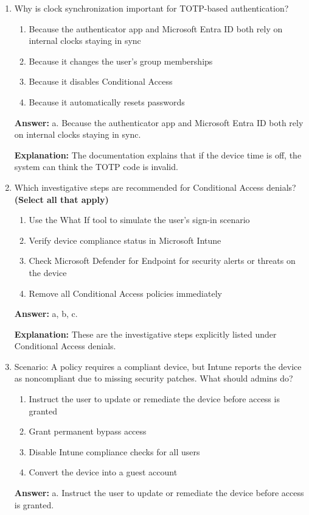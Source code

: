 \documentclass[10pt]{article}
\begin{document}
\begin{enumerate}[leftmargin=*]
\textbf{Explanation:} These are the resolution steps listed in the MFA troubleshooting scenario, while clock synchronization is also important rather than something to ignore.

\item Why is clock synchronization important for TOTP-based authentication?
\begin{enumerate}[label=\alph*., leftmargin=1.5em]
\item Because the authenticator app and Microsoft Entra ID both rely on internal clocks staying in sync
\item Because it changes the user’s group memberships
\item Because it disables Conditional Access
\item Because it automatically resets passwords
\end{enumerate}
\textbf{Answer:} a. Because the authenticator app and Microsoft Entra ID both rely on internal clocks staying in sync.

\textbf{Explanation:} The documentation explains that if the device time is off, the system can think the TOTP code is invalid.

\item Which investigative steps are recommended for Conditional Access denials? \textbf{(Select all that apply)}
\begin{enumerate}[label=\alph*., leftmargin=1.5em]
\item Use the What If tool to simulate the user’s sign-in scenario
\item Verify device compliance status in Microsoft Intune
\item Check Microsoft Defender for Endpoint for security alerts or threats on the device
\item Remove all Conditional Access policies immediately
\end{enumerate}
\textbf{Answer:} a, b, c.

\textbf{Explanation:} These are the investigative steps explicitly listed under Conditional Access denials.

\item Scenario: A policy requires a compliant device, but Intune reports the device as noncompliant due to missing security patches. What should admins do?
\begin{enumerate}[label=\alph*., leftmargin=1.5em]
\item Instruct the user to update or remediate the device before access is granted
\item Grant permanent bypass access
\item Disable Intune compliance checks for all users
\item Convert the device into a guest account
\end{enumerate}
\textbf{Answer:} a. Instruct the user to update or remediate the device before access is granted.


\end{enumerate}
\end{document}
